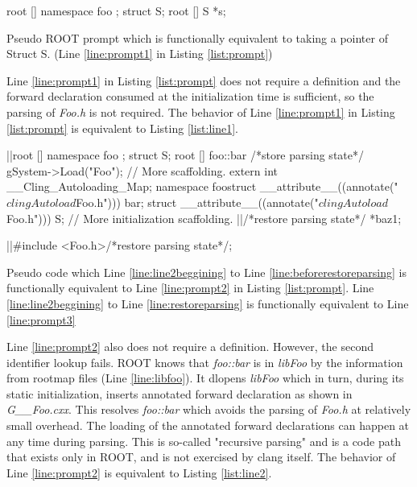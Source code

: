 \documentclass{webofc}
\begin{document}
\begin{listing}[h]
    \noindent
    \begin{minipage}[h]{.7\textwidth}
    \begin{cppcode*}{}
    root [] namespace foo { }; struct S;
    root [] S *s;
    \end{cppcode*}
    \end{minipage}
    \caption{Pseudo ROOT prompt which is functionally equivalent to taking a pointer of Struct S. (Line \ref{line:prompt1} in Listing \ref{list:prompt})}
    \label{list:line1}
\end{listing}

Line \ref{line:prompt1} in Listing \ref{list:prompt} does not require a definition and the forward declaration consumed at the initialization time is sufficient, so the parsing of {\it Foo.h} is not required. The behavior of Line \ref{line:prompt1} in Listing \ref{list:prompt} is equivalent to Listing \ref{list:line1}.

\begin{listing}[h]
    \noindent
    \begin{minipage}[h]{.7\textwidth}
    \begin{cppcode*}{}
    |\label{line:line2beggining}|root [] namespace foo { }; struct S;
    root [] foo::bar /*store parsing state*/
        gSystem->Load("Foo");
        // More scaffolding.
        extern int __Cling_Autoloading_Map;
        namespace foo{struct __attribute__((annotate("$clingAutoload$Foo.h"))) bar;}
        struct __attribute__((annotate("$clingAutoload$Foo.h"))) S;
        // More initialization scaffolding.
        |\label{line:beforerestoreparsing}|/*restore parsing state*/ *baz1;
        
        |\label{line:restoreparsing}|#include <Foo.h>/*restore parsing state*/;
    \end{cppcode*}
    \end{minipage}
    \caption{Pseudo code which Line \ref{line:line2beggining} to Line \ref{line:beforerestoreparsing} is functionally equivalent to Line \ref{line:prompt2} in Listing \ref{list:prompt}. Line \ref{line:line2beggining} to Line \ref{line:restoreparsing} is functionally equivalent to Line \ref{line:prompt3}}
    \label{list:line2}
\end{listing}

Line \ref{line:prompt2} also does not require a definition. However, the second identifier lookup fails. ROOT knows that {\it foo::bar} is in {\it libFoo} by the information from rootmap files (Line \ref{line:libfoo}). It dlopens {\it libFoo} which in turn, during its static initialization, inserts annotated forward declaration as shown in {\it G\_\_Foo.cxx}. This resolves {\it foo::bar} which avoids the parsing of {\it Foo.h} at relatively small overhead.
The loading of the annotated forward declarations can happen at any time during parsing. This is so-called "recursive parsing" and is a code path that exists only in ROOT, and is not exercised by clang itself. The behavior of Line \ref{line:prompt2} is equivalent to Listing \ref{list:line2}.
\end{document}
